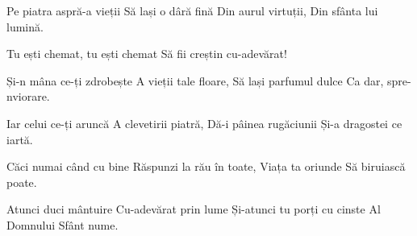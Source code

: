 \beginverse
Pe piatra aspră-a vieții
Să lași o dâră fină
Din aurul virtuții,
Din sfânta lui lumină.
\endverse

\beginchorus
Tu ești chemat, tu ești chemat
Să fii creștin cu-adevărat!
\endchorus

\beginverse
Și-n mâna ce-ți zdrobește
A vieții tale floare,
Să lași parfumul dulce
Ca dar, spre-nviorare.
\endverse

\beginverse
Iar celui ce-ți aruncă
A clevetirii piatră,
Dă-i pâinea rugăciunii
Și-a dragostei ce iartă.
\endverse

\beginverse
Căci numai când cu bine
Răspunzi la rău în toate,
Viața ta oriunde
Să biruiască poate.
\endverse

\beginverse
Atunci duci mântuire
Cu-adevărat prin lume
Și-atunci tu porți cu cinste
Al Domnului Sfânt nume.
\endverse
\endsong